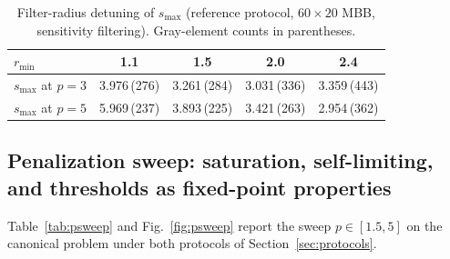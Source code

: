 \documentclass[11pt,a4paper]{article}
\newcommand{\smax}{s_{\max}}
\begin{document}
\begin{table}[t]
\centering\small
\caption{Filter-radius detuning of $\smax$ (reference protocol,
$60{\times}20$ MBB, sensitivity filtering). Gray-element counts in
parentheses.}
\label{tab:rmin}
\begin{tabular}{lcccc}
\toprule
$r_{\min}$ & 1.1 & 1.5 & 2.0 & 2.4 \\
\midrule
$\smax$ at $p=3$ & 3.976\,(276) & 3.261\,(284) & 3.031\,(336) & 3.359\,(443) \\
$\smax$ at $p=5$ & 5.969\,(237) & 3.893\,(225) & 3.421\,(263) & 2.954\,(362) \\
\bottomrule
\end{tabular}
\end{table}

\subsection{Penalization sweep: saturation, self-limiting, and thresholds
as fixed-point properties}\label{sec:psweep}

Table~\ref{tab:psweep} and Fig.~\ref{fig:psweep} report the sweep
$p\in[1.5,5]$ on the canonical problem under both protocols of
Section~\ref{sec:protocols}.
\end{document}
